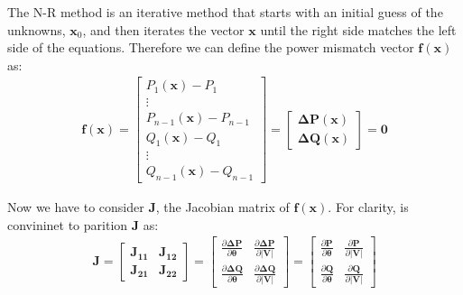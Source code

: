 \documentclass[a4paper,11pt, titlepage, twoside]{article}
\begin{document}
The N-R method is an iterative method that starts with an initial guess of the unknowns, $\mathbf{x}_0$, and then iterates the vector $\mathbf{x}$ until the right side matches the left side of the equations. Therefore we
can define the power mismatch vector $\mathbf{f(x)}$ as:
\begin{equation}
\begin{aligned}
    \mathbf{f(x)} = \begin{bmatrix}
    P_1(\mathbf{x}) - P_1 \\
    \vdots \\
    P_{n-1}(\mathbf{x}) - P_{n-1} \\
    Q_1(\mathbf{x}) - Q_1 \\
    \vdots \\
    Q_{n-1}(\mathbf{x}) - Q_{n-1}
    \end{bmatrix} = \begin{bmatrix}
    \mathbf{\Delta P(\mathbf{x})} \\
    \mathbf{\Delta Q(\mathbf{x})}
    \end{bmatrix} = \mathbf{0}
\end{aligned}
\end{equation}


Now we have to consider $\mathbf{J}$, the Jacobian matrix of $\mathbf{f(x)}$. For clarity, is convininet to parition $\mathbf{J}$ as:
\begin{equation}
\begin{aligned}
    \mathbf{J} = \begin{bmatrix}
    \mathbf{J_{11}} & \mathbf{J_{12}} \\
    \mathbf{J_{21}} & \mathbf{J_{22}}
    \end{bmatrix} = \begin{bmatrix}
        \frac{\partial \mathbf{\Delta P}}{\partial \mathbf{\theta}} & \frac{\partial \mathbf{\Delta P}}{\partial \mathbf{|V|}} \\
        \frac{\partial \mathbf{\Delta Q}}{\partial \mathbf{\theta}} & \frac{\partial \mathbf{\Delta Q}}{\partial \mathbf{|V|}}
    \end{bmatrix} = \begin{bmatrix}
    \frac{\partial \mathbf{P}}{\partial \mathbf{\theta}} & \frac{\partial \mathbf{P}}{\partial \mathbf{|V|}} \\
    \frac{\partial \mathbf{Q}}{\partial \mathbf{\theta}} & \frac{\partial \mathbf{Q}}{\partial \mathbf{|V|}}
    \end{bmatrix}
\end{aligned}
\end{equation}
\end{document}
